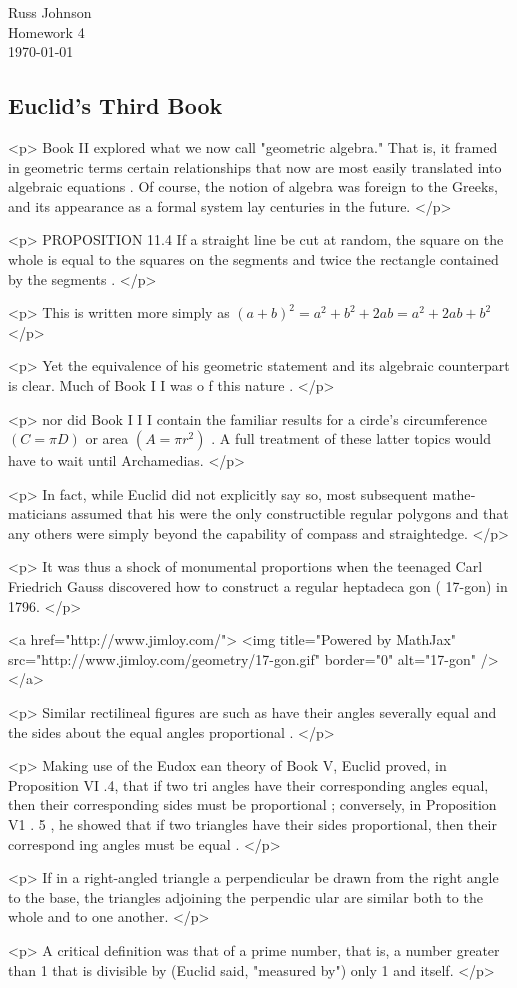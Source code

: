 \documentclass[12 pt]{article}
\begin{document}
\begin{flushright}
Russ Johnson \\
Homework 4\\
\today \\
\end{flushright}
%
\subsection*{Euclid's Third Book}

<p>
Book II explored what we now call "geometric algebra." That is, it
framed in geometric terms certain relationships that now are most easily
translated into algebraic equations . Of course, the notion of algebra was
foreign to the Greeks, and its appearance as a formal system lay centuries
in the future.
</p>

<p>
PROPOSITION 11.4 If a straight line be cut at random, the square on the
whole is equal to the squares on the segments and twice the rectangle
contained by the segments .
</p>

<p>
This is written more simply as $(a + b)^2= a^2 +b^2 + 2 ab = a^2 + 2ab + b^2$
</p>

<p>
Yet the equivalence of his geo­metric statement and its algebraic counterpart is clear. Much of Book I I
was o f this nature .
</p>

<p>
nor did Book I I I contain the familiar results for a cirde's circumference
$( C = \pi D)$ or area $(A = \pi r^2)$ . A full treatment of these latter topics would have to wait
until Archamedias.
</p>

<p>
In fact, while Euclid did not explicitly say so, most subsequent mathe­
maticians assumed that his were the only constructible regular polygons
and that any others were simply beyond the capability of compass and
straightedge.
</p>

<p>
It was thus a shock of monumental proportions when the teenaged
Carl Friedrich Gauss discovered how to construct a regular heptadeca­
gon ( 17-gon) in 1796.
</p>

<a href="http://www.jimloy.com/">
  <img title="Powered by MathJax"
    src="http://www.jimloy.com/geometry/17-gon.gif"
    border="0" alt="17-gon" />
</a>

<p>
Similar rectilineal figures are such as have their angles
severally equal and the sides about the equal angles proportional .
</p>

<p>
Making use of the Eudox­
ean theory of Book V, Euclid proved, in Proposition VI .4, that if two tri­
angles have their corresponding angles equal, then their corresponding
sides must be proportional ; conversely, in Proposition V1 . 5 , he showed
that if two triangles have their sides proportional, then their correspond­
ing angles must be equal .
</p>

<p>
If in a right-angled triangle a perpendicular be drawn
from the right angle to the base, the triangles adjoining the perpendic­
ular are similar both to the whole and to one another.
</p>

<p>
A critical definition was that of a prime number, that is,
a number greater than 1 that is divisible by (Euclid said, "measured by")
only 1 and itself.
</p>
\end{document}
